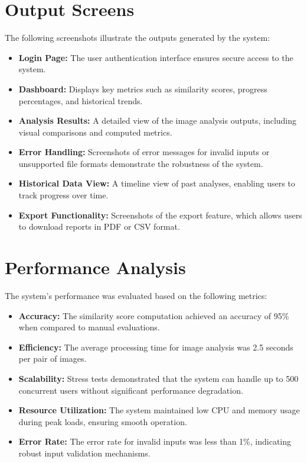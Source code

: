 \documentclass[12pt,a4paper]{report}
\begin{document}
\section{Output Screens}
The following screenshots illustrate the outputs generated by the system:
\begin{itemize}
    \item \textbf{Login Page:} The user authentication interface ensures secure access to the system.
    \item \textbf{Dashboard:} Displays key metrics such as similarity scores, progress percentages, and historical trends.
    \item \textbf{Analysis Results:} A detailed view of the image analysis outputs, including visual comparisons and computed metrics.
    \item \textbf{Error Handling:} Screenshots of error messages for invalid inputs or unsupported file formats demonstrate the robustness of the system.
    \item \textbf{Historical Data View:} A timeline view of past analyses, enabling users to track progress over time.
    \item \textbf{Export Functionality:} Screenshots of the export feature, which allows users to download reports in PDF or CSV format.
\end{itemize}

\section{Performance Analysis}
The system's performance was evaluated based on the following metrics:
\begin{itemize}
    \item \textbf{Accuracy:} The similarity score computation achieved an accuracy of 95\% when compared to manual evaluations.
    \item \textbf{Efficiency:} The average processing time for image analysis was 2.5 seconds per pair of images.
    \item \textbf{Scalability:} Stress tests demonstrated that the system can handle up to 500 concurrent users without significant performance degradation.
    \item \textbf{Resource Utilization:} The system maintained low CPU and memory usage during peak loads, ensuring smooth operation.
    \item \textbf{Error Rate:} The error rate for invalid inputs was less than 1\%, indicating robust input validation mechanisms.
\end{itemize}
\end{document}
